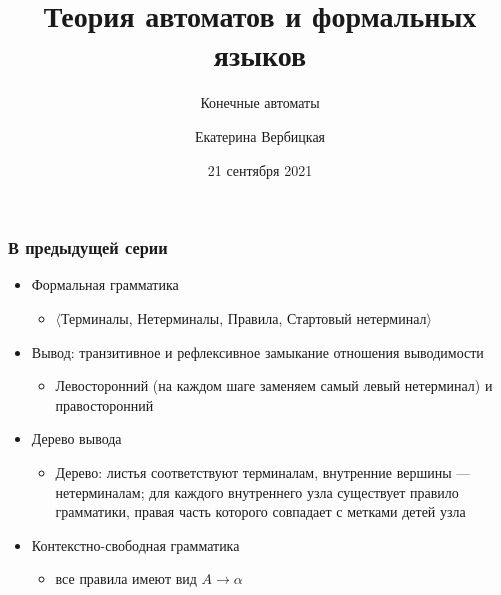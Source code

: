 \documentclass{beamer}
\title[]{Теория автоматов и формальных языков}
\subtitle[]{Конечные автоматы}
\institute[]{
Санкт-Петербургский государственный электротехнический университет <<ЛЭТИ>>\\
}
\author[]{Екатерина Вербицкая}
\date{21 сентября 2021}
\begin{document}
{
  \begin{frame}
    \titlepage
  \end{frame}
}

\begin{frame}[fragile]
  \transwipe[direction=90]
  \frametitle{В предыдущей серии}
  \begin{itemize}
    \item Формальная грамматика
    \begin{itemize}
      \item $\langle$Терминалы, Нетерминалы, Правила, Стартовый нетерминал$\rangle$
    \end{itemize}
   \item Вывод: транзитивное и рефлексивное замыкание отношения выводимости
   \begin{itemize}
     \item Левосторонний (на каждом шаге заменяем самый левый нетерминал) и правосторонний
   \end{itemize}
   \item Дерево вывода
   \begin{itemize}
     \item Дерево: листья соответствуют терминалам, внутренние вершины --- нетерминалам; для каждого внутреннего узла существует правило грамматики, правая часть которого совпадает с метками детей узла
   \end{itemize}
    \item  Контекстно-свободная грамматика
      \begin{itemize}
        \item все правила имеют вид $A \to \alpha$

      \end{itemize}

      \end{itemize}

\end{frame}
\end{document}

